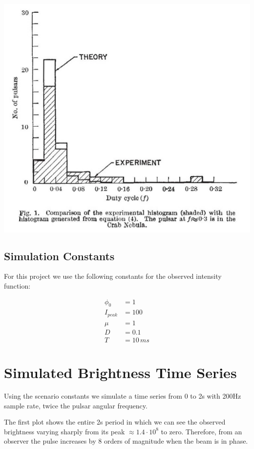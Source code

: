 \documentclass{article}
\begin{document}
\includegraphics[scale=.45]{dutycycle.png}

\subsection{Simulation Constants}

For this project we use the following constants for the observed intensity
function:

\begin{align*}
    \phi_{0} &= 1 \\
    I_{peak} &= 100\\
    \mu &= 1\\
    D &= 0.1\\
    T &= 10 \, ms 
\end{align*}

\section{Simulated Brightness Time Series}

Using the scenario constants we simulate a time series from 0 to 2s with 200Hz
sample rate, twice the pulsar angular frequency.

The first plot shows the entire 2s period in which we can see the observed
brightness varying sharply from its peak $\approx 1.4 \cdot 10^8$ to zero.
Therefore, from an observer the pulse increases by 8 orders of magnitude when 
the beam is in phase.
\end{document}
